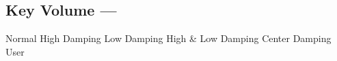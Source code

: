 \subsection[Key Volume]{Key Volume --- \UiKey{\I}\UiKey{\SET}}









































Normal
High Damping
Low Damping
High \& Low Damping
Center Damping
User
